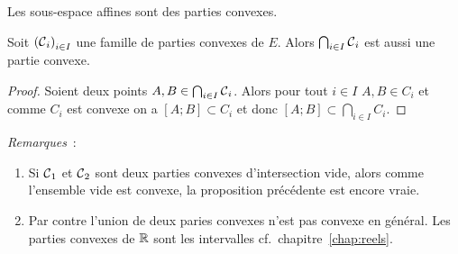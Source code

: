 \begin{cor}
  Les sous-espace affines sont des parties convexes.
\end{cor}
%
\begin{prop}
  Soit \({(\mathcal{C}{}_i)}_{i \in I}\) une famille de parties convexes de \(E\). 
  Alors \(\bigcap_{i \in I} \mathcal{C}{}_i\) est aussi une partie convexe.
\end{prop}
\begin{proof}
  Soient deux points \(A,B \in \bigcap_{i\in I} \mathcal{C}{}_i\). Alors pour tout 
  \(i \in I\) \(A,B \in C_i\) et comme \(C_i\) est convexe on a \([A;B] \subset 
  C_i\) et donc \([A;B] \subset \bigcap_{i \in I} C_i\).
\end{proof}
%
\emph{Remarques}~:
\begin{enumerate}
  \item Si \(\mathcal{C}{}_1\) et \(\mathcal{C}{}_2\)  sont deux parties convexes 
    d'intersection vide, alors comme l'ensemble vide est convexe, la proposition 
    précédente est encore vraie.
  \item Par contre l'union de deux paries convexes n'est pas convexe en général. 
    Les parties convexes de \(\mathbb{R}\) sont les intervalles cf.\ chapitre~\ref{chap:reels}.
\end{enumerate}
